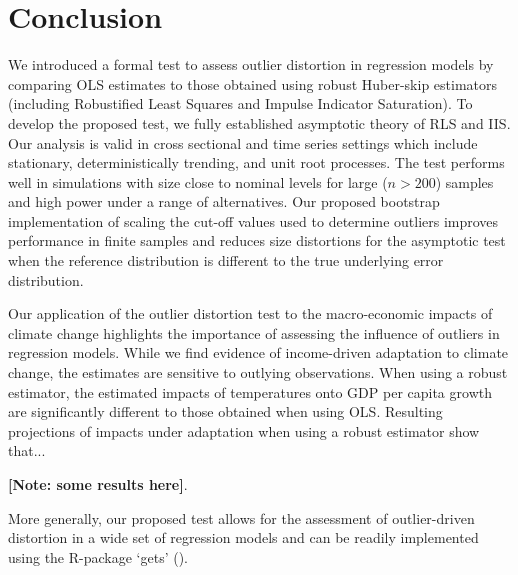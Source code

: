 \documentclass[11pt, letterpaper]{article}
\numberwithin{algorithm}{section}
\numberwithin{assumption}{section}
\numberwithin{lemma}{section}
\numberwithin{theorem}{section}
\numberwithin{corollary}{section}
\numberwithin{remark}{section}
\numberwithin{equation}{section}
\numberwithin{figure}{section}
\numberwithin{table}{section}
\begin{document}
\section{Conclusion}
We introduced a formal test to assess outlier distortion in regression models by comparing OLS estimates to those obtained using robust Huber-skip estimators (including Robustified Least Squares and Impulse Indicator Saturation). To develop the proposed test, we fully established asymptotic theory of RLS and IIS. Our analysis is valid in cross sectional and time series settings which include stationary, deterministically trending, and unit root processes. The test performs well in simulations with size close to nominal levels for large ($n>200$) samples and high power under a range of alternatives. Our proposed bootstrap implementation of scaling the cut-off values used to determine outliers improves performance in finite samples and reduces size distortions for the asymptotic test when the reference distribution is different to the true underlying error distribution.

Our application of the outlier distortion test to the macro-economic impacts of climate change highlights the importance of assessing the influence of outliers in regression models. While we find evidence of income-driven adaptation to climate change, the estimates are sensitive to outlying observations.
When using a robust estimator, the estimated impacts of temperatures onto GDP per capita growth are significantly different to those obtained when using OLS. Resulting projections of impacts under adaptation when using a robust estimator show that...

\textbf{[Note: some results here]}.

More generally, our proposed test allows for the assessment of outlier-driven distortion in a wide set of regression models and can be readily implemented using the R-package `gets' (\citealt{pretis2018automated}).

\newpage
\linespread{1} \selectfont




\newpage
\appendix
\end{document}
